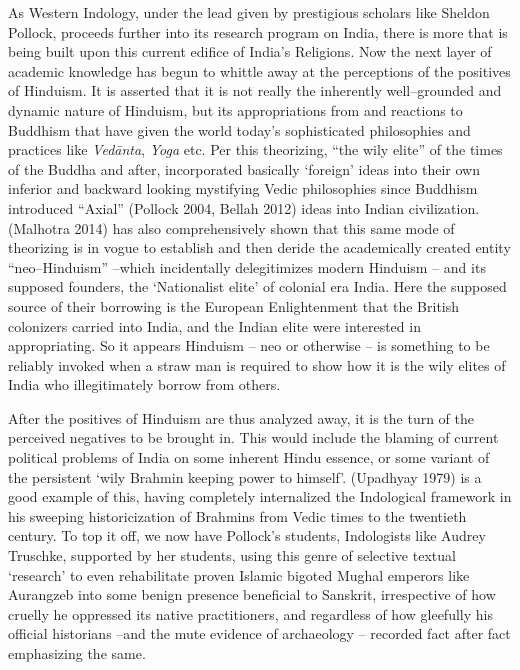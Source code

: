 As Western Indology, under the lead given by prestigious scholars like Sheldon Pollock, proceeds further into its research program on India, there is more that is being built upon this current edifice of India’s Religions. Now the next layer of academic knowledge has begun to whittle away at the perceptions of the positives of Hinduism. It is asserted that it is not really the inherently well–grounded and dynamic nature of Hinduism, but its appropriations from and reactions to Buddhism that have given the world today’s sophisticated philosophies and practices like \textit{Vedānta}, \textit{Yoga} etc. Per this theorizing, “the wily elite” of the times of the Buddha and after, incorporated basically ‘foreign’ ideas into their own inferior and backward looking mystifying Vedic philosophies since Buddhism introduced “Axial” (Pollock 2004, Bellah 2012) ideas into Indian civilization. (Malhotra 2014) has also comprehensively shown that this same mode of theorizing is in vogue to establish and then deride the academically created entity “neo–Hinduism” –which incidentally delegitimizes modern Hinduism – and its supposed founders, the ‘Nationalist elite’ of colonial era India. Here the supposed source of their borrowing is the European Enlightenment that the British colonizers carried into India, and the Indian elite were interested in appropriating. So it appears Hinduism – neo or otherwise – is something to be reliably invoked when a straw man is required to show how it is the wily elites of India who illegitimately borrow from others.

After the positives of Hinduism are thus analyzed away, it is the turn of the perceived negatives to be brought in. This would include the blaming of current political problems of India on some inherent Hindu essence, or some variant of the persistent ‘wily Brahmin keeping power to himself’. (Upadhyay 1979) is a good example of this, having completely internalized the Indological framework in his sweeping historicization of Brahmins from Vedic times to the twentieth century. To top it off, we now have Pollock’s students, Indologists like Audrey Truschke, supported by her students, using this genre of selective textual ‘research’ to even rehabilitate proven Islamic bigoted Mughal emperors like Aurangzeb into some benign presence beneficial to Sanskrit, irrespective of how cruelly he oppressed its native practitioners, and regardless of how gleefully his official historians –and the mute evidence of archaeology – recorded fact after fact emphasizing the same.


